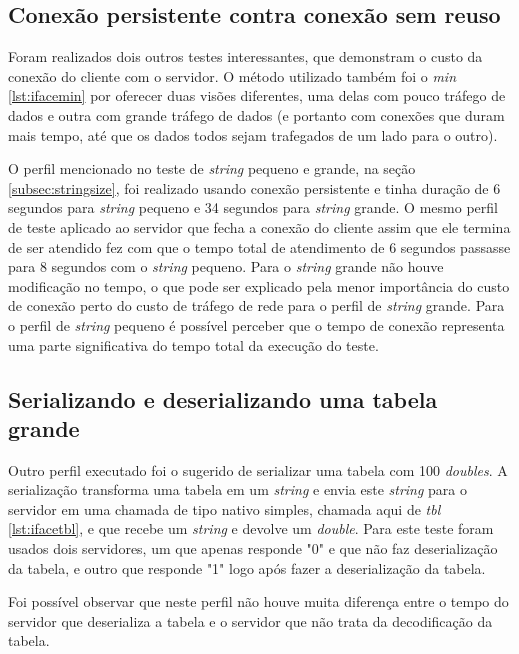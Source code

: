 \documentclass[11pt]{article}
\begin{document}
\subsection{Conexão persistente contra conexão sem reuso}\label{subsec:persist}

Foram realizados dois outros testes interessantes, que demonstram o custo da
conexão do cliente com o servidor. O método utilizado também foi o
\textit{min} \ref{lst:ifacemin} por oferecer duas visões diferentes, uma delas com
pouco tráfego de dados e outra com grande tráfego de dados (e portanto com
conexões que duram mais tempo, até que os dados todos sejam trafegados de um
lado para o outro).

O perfil mencionado no teste de \textit{string} pequeno e grande, na seção
\ref{subsec:stringsize}, foi realizado usando conexão persistente e tinha
duração de 6 segundos para \textit{string} pequeno e 34 segundos para
\textit{string} grande. O mesmo perfil de teste aplicado ao servidor que fecha a
conexão do cliente assim que ele termina de ser atendido fez com que o tempo
total de atendimento de 6 segundos passasse para 8 segundos com o
\textit{string} pequeno. Para o \textit{string} grande não houve modificação no
tempo, o que pode ser explicado pela menor importância do custo de conexão perto
do custo de tráfego de rede para o perfil de \textit{string} grande. Para o
perfil de \textit{string} pequeno é possível perceber que o tempo de conexão
representa uma parte significativa do tempo total da execução do teste.

\subsection{Serializando e deserializando uma tabela grande}\label{subsec:serdeser}

Outro perfil executado foi o sugerido de serializar uma tabela com 100
\textit{doubles}. A serialização transforma uma tabela em um \textit{string} e
envia este \textit{string} para o servidor em uma chamada de tipo nativo
simples, chamada aqui de \textit{tbl} \ref{lst:ifacetbl}, e que recebe um
\textit{string} e devolve um \textit{double}. Para este teste foram usados dois
servidores, um que apenas responde "0" e que não faz deserialização da tabela, e
outro que responde "1" logo após fazer a deserialização da tabela.

Foi possível observar que neste perfil não houve muita diferença entre o tempo
do servidor que deserializa a tabela e o servidor que não trata da decodificação
da tabela.
\end{document}
